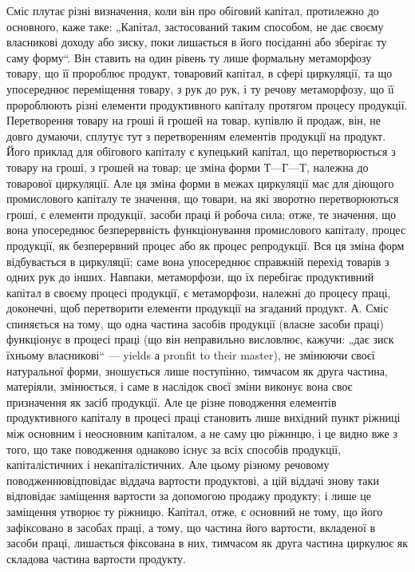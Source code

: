 Сміс плутає різні визначення, коли він про обіговий капітал, протилежно
до основного, каже таке: „Капітал, застосований таким способом,
не дає своєму власникові доходу або зиску, поки лишається в його посіданні
або зберігає ту саму форму“. Він ставить на один рівень ту лише
формальну метаморфозу товару, що її пророблює продукт, товаровий
капітал, в сфері циркуляції, та що упосереднює переміщення товару,
з рук до рук, і ту речову метаморфозу, що її пророблюють різні елементи
продуктивного капіталу протягом процесу продукції. Перетворення
товару на гроші й грошей на товар, купівлю й продаж, він, не довго
думаючи, сплутує тут з перетворенням елементів продукції на продукт.
Його приклад для обігового капіталу є купецький капітал, що перетворюється
з товару на гроші, з грошей на товар; це зміна форми $Т — Г — Т$,
належна до товарової циркуляції. Але ця зміна форми в межах циркуляції
має для діющого промислового капіталу те значення, що товари, на
які зворотно перетворюються гроші, є елементи продукції, засоби праці
й робоча сила; отже, те значення, що вона упосереднює безперервність
функціонування промислового капіталу, процес продукції, як безперервний
процес або як процес репродукції. Вся ця зміна форм відбувається
в циркуляції; саме вона упосереднює справжній перехід товарів з
одних рук до інших. Навпаки, метаморфози, що їх перебігає продуктивний
капітал в своєму процесі продукції, є метаморфози, належні до
процесу праці, доконечні, щоб перетворити елементи продукції на
згаданий продукт. А. Сміс спиняється на тому, що одна частина засобів
продукції (власне засоби праці) функціонує в процесі праці (що він
неправильно висловлює, кажучи: „дає зиск їхньому власникові“ — yields а
pronfit to their master), не змінюючи своєї натуральної форми, зношується
лише поступінно, тимчасом як друга частина, матеріяли, змінюється, і
саме в наслідок своєї зміни виконує вона своє призначення як засіб продукції.
Але це різне поводження елементів продуктивного капіталу в
процесі праці становить лише вихідний пункт ріжниці між основним і неосновним
капіталом, а не саму цю ріжннцю, і це видно вже з того, що
таке поводження однаково існує за всіх способів продукції, капіталістичних
і некапіталістичних. Але цьому різному речовому поводженнювідповідає
віддача вартости продуктові, а цій віддачі знову таки відповідає
заміщення вартости за допомогою продажу продукту; і лише це
заміщення утворює ту ріжницю. Капітал, отже, є основний не тому, що
його зафіксовано в засобах праці, а тому, що частина його вартости,
вкладеної в засоби праці, лишається фіксована в них, тимчасом як друга
частина циркулює як складова частина вартости продукту.

